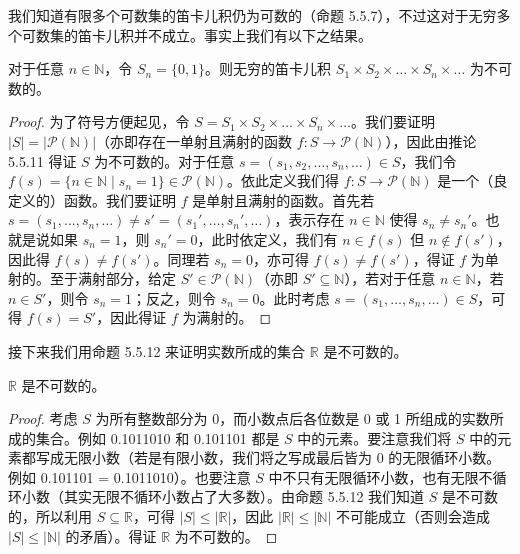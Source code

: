 我们知道有限多个可数集的笛卡儿积仍为可数的（命题 5.5.7），不过这对于无穷多个可数集的笛卡儿积并不成立。事实上我们有以下之结果。

\begin{proposition}
对于任意 $n \in \mathbb{N}$，令 $S_n = \{0, 1\}$。则无穷的笛卡儿积 $S_1 \times S_2 \times \dots \times S_n \times \dots$ 为不可数的。
\end{proposition}

\begin{proof}
为了符号方便起见，令 $S = S_1 \times S_2 \times \dots \times S_n \times \dots$。我们要证明 $|S| = |\mathcal{P}(\mathbb{N})|$（亦即存在一单射且满射的函数 $f : S \to \mathcal{P}(\mathbb{N})$），因此由推论 5.5.11 得证 $S$ 为不可数的。对于任意 $s = (s_1, s_2, \dots, s_n, \dots) \in S$，我们令 $f(s) = \{n \in \mathbb{N} \mid s_n = 1\} \in \mathcal{P}(\mathbb{N})$。依此定义我们得 $f : S \to \mathcal{P}(\mathbb{N})$ 是一个（良定义的）函数。我们要证明 $f$ 是单射且满射的函数。首先若 $s = (s_1, \dots, s_n, \dots) \neq s' = (s_1', \dots, s_n', \dots)$，表示存在 $n \in \mathbb{N}$ 使得 $s_n \neq s_n'$。也就是说如果 $s_n = 1$，则 $s_n' = 0$，此时依定义，我们有 $n \in f(s)$ 但 $n \notin f(s')$，因此得 $f(s) \neq f(s')$。同理若 $s_n = 0$，亦可得 $f(s) \neq f(s')$，得证 $f$ 为单射的。至于满射部分，给定 $S' \in \mathcal{P}(\mathbb{N})$（亦即 $S' \subseteq \mathbb{N}$），若对于任意 $n \in \mathbb{N}$，若 $n \in S'$，则令 $s_n = 1$；反之，则令 $s_n = 0$。此时考虑 $s = (s_1, \dots, s_n, \dots) \in S$，可得 $f(s) = S'$，因此得证 $f$ 为满射的。
\end{proof}

接下来我们用命题 5.5.12 来证明实数所成的集合 $\mathbb{R}$ 是不可数的。

\begin{proposition}
$\mathbb{R}$ 是不可数的。
\end{proposition}

\begin{proof}
考虑 $S$ 为所有整数部分为 0，而小数点后各位数是 0 或 1 所组成的实数所成的集合。例如 0.1011010 和 0.101101 都是 $S$ 中的元素。要注意我们将 $S$ 中的元素都写成无限小数（若是有限小数，我们将之写成最后皆为 0 的无限循环小数。例如 0.101101 = 0.1011010）。也要注意 $S$ 中不只有无限循环小数，也有无限不循环小数（其实无限不循环小数占了大多数）。由命题 5.5.12 我们知道 $S$ 是不可数的，所以利用 $S \subseteq \mathbb{R}$，可得 $|S| \leq |\mathbb{R}|$，因此 $|\mathbb{R}| \leq |\mathbb{N}|$ 不可能成立（否则会造成 $|S| \leq |\mathbb{N}|$ 的矛盾）。得证 $\mathbb{R}$ 为不可数的。
\end{proof}

